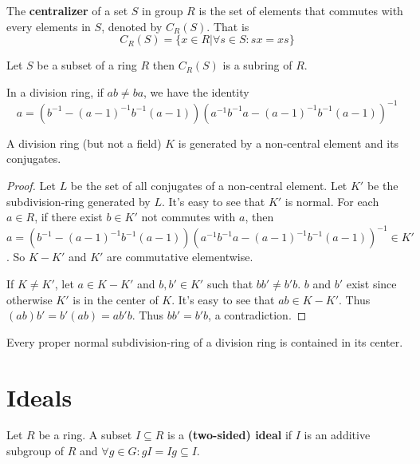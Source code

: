 \documentclass[12pt]{book}
\begin{document}
\begin{definition}
	The \textbf{centralizer} of a set $S$ in group $R$ is the set of elements that commutes with every elements in $S$, denoted by $C_R(S)$. That is
	\begin{equation}
		C_R(S)=\{x\in R|\forall s\in S:sx=xs\}
	\end{equation} 
\end{definition}

\begin{lemma}
	Let $S$ be a subset of a ring $R$ then $C_R(S)$ is a subring of $R$.
\end{lemma}

\begin{lemma}
	In a division ring, if $ab\neq ba$, we have the identity
	\begin{equation}
		a=(b^{-1}-(a-1)^{-1}b^{-1}(a-1))(a^{-1}b^{-1}a-(a-1)^{-1}b^{-1}(a-1))^{-1}
	\end{equation}
\end{lemma}

\begin{theorem}
	A division ring (but not a field) $K$ is generated by a non-central element and its conjugates.
\end{theorem}
\begin{proof}
	Let $L$ be the set of all conjugates of a non-central element. Let $K'$ be the subdivision-ring generated by $L$. It's easy to see that $K'$ is normal. For each $a\in R$, if there exist $b\in K'$ not commutes with $a$, then $a=(b^{-1}-(a-1)^{-1}b^{-1}(a-1))(a^{-1}b^{-1}a-(a-1)^{-1}b^{-1}(a-1))^{-1}\in K'$. So $K-K'$ and $K'$ are commutative elementwise.
	
	If $K\neq K'$, let $a\in K-K'$ and $b,b'\in K'$ such that $bb'\neq b'b$. $b$ and $b'$ exist since otherwise $K'$ is in the center of $K$. It's easy to see that $ab\in K-K'$. Thus $(ab)b'=b'(ab)=ab'b$. Thus $bb'=b'b$, a contradiction.
\end{proof}

\begin{corollary}
	Every proper normal subdivision-ring of a division ring is contained in its center.
\end{corollary}

\section{Ideals}

\begin{definition}
	Let $R$ be a ring. A subset $I\subseteq R$ is a {\bf (two-sided) ideal} if $I$ is an additive subgroup of $R$ and $\forall g\in G:gI=Ig\subseteq I$.
\end{definition}
\end{document}
